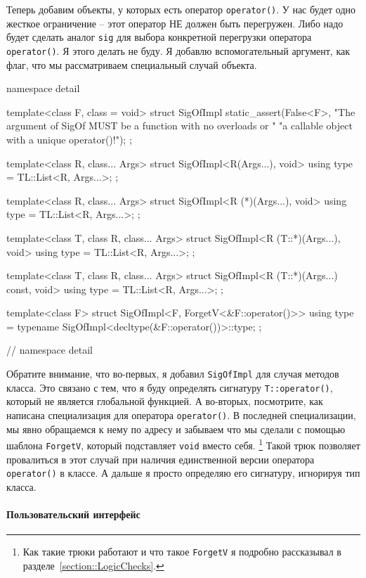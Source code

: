 Теперь добавим объекты, у которых есть оператор \verb"operator()".
У нас будет одно жесткое ограничение -- этот оператор НЕ должен быть перегружен.
Либо надо будет сделать аналог \verb"sig" для выбора конкретной перегрузки оператора \verb"operator()".
Я этого делать не буду.
Я добавлю вспомогательный аргумент, как флаг, что мы рассматриваем специальный случай объекта.
\begin{cppcode}
namespace detail {
template<class F, class = void>
struct SigOfImpl {
  static_assert(False<F>,
                "The argument of SigOf MUST be a function with no overloads or "
                "a callable object with a unique operator()!");
};

template<class R, class... Args>
struct SigOfImpl<R(Args...), void> {
  using type = TL::List<R, Args...>;
};

template<class R, class... Args>
struct SigOfImpl<R (*)(Args...), void> {
  using type = TL::List<R, Args...>;
};

template<class T, class R, class... Args>
struct SigOfImpl<R (T::*)(Args...), void> {
  using type = TL::List<R, Args...>;
};

template<class T, class R, class... Args>
struct SigOfImpl<R (T::*)(Args...) const, void> {
  using type = TL::List<R, Args...>;
};

template<class F>
struct SigOfImpl<F, ForgetV<&F::operator()>> {
  using type = typename SigOfImpl<decltype(&F::operator())>::type;
};
} // namespace detail
\end{cppcode}
Обратите внимание, что во-первых, я добавил \verb"SigOfImpl" для случая методов класса.
Это связано с тем, что я буду определять сигнатуру \verb"T::operator()", который не является глобальной функцией.
А во-вторых, посмотрите, как написана специализация для оператора \verb"operator()".
В последней специализации, мы явно обращаемся к нему по адресу и забываем что мы сделали с помощью шаблона \verb"ForgetV", который подставляет \verb"void" вместо себя.%
\footnote{Как такие трюки работают и что такое \verb"ForgetV" я подробно рассказывал в разделе~\ref{section::LogicChecks}.}
Такой трюк позволяет провалиться в этот случай при наличия единственной версии оператора \verb"operator()" в классе.
А дальше я просто определяю его сигнатуру, игнорируя тип класса.

\paragraph{Пользовательский интерфейс}

